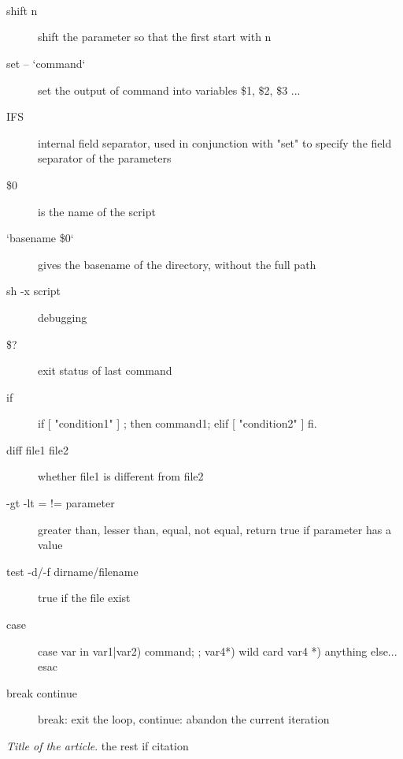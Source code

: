 \documentclass[12pt,a4paper]{report}
\begin{document}
\paragraph{\color{RoyalBlue}{looping - if - shift}\\}
\begin{description}
\item[shift n] shift the parameter so that the first start with n  \\
\item[set -- `command`] set the output of command into variables \$1, \$2, \$3 ...  \\
\item[IFS] internal field separator, used in conjunction with "set" to specify the field separator of the parameters  \\
\item[\$0] is the name of the script  \\
\item[`basename \$0`] gives the basename of the directory, without the full path  \\
\item[sh -x script] debugging  \\
\item[\$?] exit status of last command  \\
\item[if] if [ "condition1" ] ; then command1; elif [ "condition2" ] fi.  \\
\item[diff file1 file2] whether file1 is different from file2  \\
\item[-gt -lt = != parameter] greater than, lesser than, equal, not equal, return true if parameter has a value  \\
\item[test -d/-f dirname/filename] true if the file exist  \\
\item[case] case var in var1|var2) command; ; var4*) wild card var4 *) anything else... esac  \\
\item[break continue] break: exit the loop, continue: abandon the current iteration
\end{description}














\newpage
\begin{thebibliography}{99}
\emph{Title of the article}. the rest if citation
\end{thebibliography}
\end{document}
